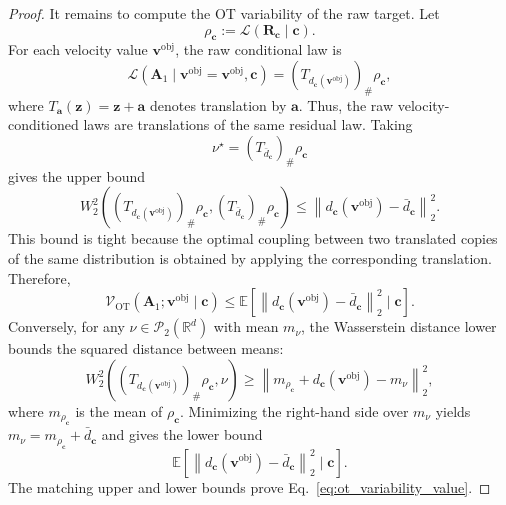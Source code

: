 \documentclass[10pt,twocolumn,letterpaper]{article}
\begin{document}
\begin{proof}
It remains to compute the OT variability of the raw target. Let
\[
    \rho_{\mathbf c}
    :=
    \mathcal L(\mathbf R_{\mathbf c}\mid\mathbf c).
\]
For each velocity value $\mathbf v^{\mathrm{obj}}$, the raw conditional law is
\[
    \mathcal L
    (
        \mathbf A_1
        \mid
        \mathbf v^{\mathrm{obj}}=\mathbf v^{\mathrm{obj}},
        \mathbf c
    )
    =
    (T_{d_{\mathbf c}(\mathbf v^{\mathrm{obj}})})_{\#}\rho_{\mathbf c},
\]
where $T_{\mathbf a}(\mathbf z)=\mathbf z+\mathbf a$ denotes translation by
$\mathbf a$. Thus, the raw velocity-conditioned laws are translations of the
same residual law. Taking
\[
    \nu^\star
    =
    (T_{\bar d_{\mathbf c}})_{\#}\rho_{\mathbf c}
\]
gives the upper bound
\[
    W_2^2
    \left(
        (T_{d_{\mathbf c}(\mathbf v^{\mathrm{obj}})})_{\#}\rho_{\mathbf c},
        (T_{\bar d_{\mathbf c}})_{\#}\rho_{\mathbf c}
    \right)
    \le
    \left\|
        d_{\mathbf c}(\mathbf v^{\mathrm{obj}})
        -
        \bar d_{\mathbf c}
    \right\|_2^2.
\]
This bound is tight because the optimal coupling between two translated copies
of the same distribution is obtained by applying the corresponding translation.
Therefore,
\[
    \mathcal V_{\mathrm{OT}}
    (
        \mathbf A_1;
        \mathbf v^{\mathrm{obj}}
        \mid
        \mathbf c
    )
    \le
    \mathbb E
    \left[
        \left\|
            d_{\mathbf c}(\mathbf v^{\mathrm{obj}})
            -
            \bar d_{\mathbf c}
        \right\|_2^2
        \mid
        \mathbf c
    \right].
\]
Conversely, for any $\nu\in\mathcal P_2(\mathbb R^d)$ with mean
$m_{\nu}$, the Wasserstein distance lower bounds the squared distance between
means:
\[
    W_2^2
    \left(
        (T_{d_{\mathbf c}(\mathbf v^{\mathrm{obj}})})_{\#}\rho_{\mathbf c},
        \nu
    \right)
    \ge
    \left\|
        m_{\rho_{\mathbf c}}
        +
        d_{\mathbf c}(\mathbf v^{\mathrm{obj}})
        -
        m_{\nu}
    \right\|_2^2,
\]
where $m_{\rho_{\mathbf c}}$ is the mean of $\rho_{\mathbf c}$. Minimizing the
right-hand side over $m_{\nu}$ yields
$m_{\nu}=m_{\rho_{\mathbf c}}+\bar d_{\mathbf c}$ and gives the lower bound
\[
    \mathbb E
    \left[
        \left\|
            d_{\mathbf c}(\mathbf v^{\mathrm{obj}})
            -
            \bar d_{\mathbf c}
        \right\|_2^2
        \mid
        \mathbf c
    \right].
\]
The matching upper and lower bounds prove
Eq.~\eqref{eq:ot_variability_value}.


\end{proof}
\end{document}
